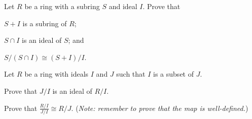 \pagebreak

\begin{problem}\label{problem-ring-isomorphism-2}
    Let $R$ be a ring with a subring $S$ and ideal $I$. Prove that
    \begin{partquestions}{\roman*}
        \item $S+I$ is a subring of $R$;
        \item $S \cap I$ is an ideal of $S$; and
        \item $S/(S\cap I)\cong (S+I)/I$.
    \end{partquestions}
\end{problem}

\begin{problem}\label{problem-ring-isomorphism-3}
    Let $R$ be a ring with ideals $I$ and $J$ such that $I$ is a subset of $J$.
    \begin{partquestions}{\roman*}
        \item Prove that $J/I$ is an ideal of $R/I$.
        \item Prove that $\frac{R/I}{J/I} \cong R/J$.\newline
        (\textit{Note: remember to prove that the map is well-defined.})
    \end{partquestions}
\end{problem}
